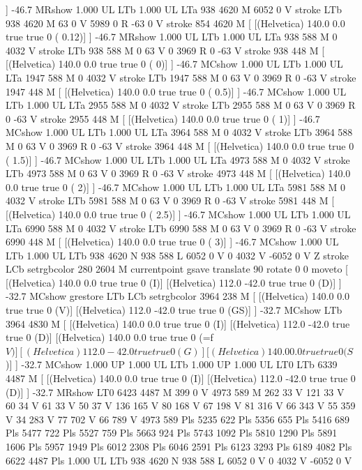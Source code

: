 ] -46.7 MRshow
1.000 UL
LTb
1.000 UL
LTa
938 4620 M
6052 0 V
stroke
LTb
938 4620 M
63 0 V
5989 0 R
-63 0 V
stroke
854 4620 M
[ [(Helvetica) 140.0 0.0 true true 0 ( 0.12)]
] -46.7 MRshow
1.000 UL
LTb
1.000 UL
LTa
938 588 M
0 4032 V
stroke
LTb
938 588 M
0 63 V
0 3969 R
0 -63 V
stroke
938 448 M
[ [(Helvetica) 140.0 0.0 true true 0 ( 0)]
] -46.7 MCshow
1.000 UL
LTb
1.000 UL
LTa
1947 588 M
0 4032 V
stroke
LTb
1947 588 M
0 63 V
0 3969 R
0 -63 V
stroke
1947 448 M
[ [(Helvetica) 140.0 0.0 true true 0 ( 0.5)]
] -46.7 MCshow
1.000 UL
LTb
1.000 UL
LTa
2955 588 M
0 4032 V
stroke
LTb
2955 588 M
0 63 V
0 3969 R
0 -63 V
stroke
2955 448 M
[ [(Helvetica) 140.0 0.0 true true 0 ( 1)]
] -46.7 MCshow
1.000 UL
LTb
1.000 UL
LTa
3964 588 M
0 4032 V
stroke
LTb
3964 588 M
0 63 V
0 3969 R
0 -63 V
stroke
3964 448 M
[ [(Helvetica) 140.0 0.0 true true 0 ( 1.5)]
] -46.7 MCshow
1.000 UL
LTb
1.000 UL
LTa
4973 588 M
0 4032 V
stroke
LTb
4973 588 M
0 63 V
0 3969 R
0 -63 V
stroke
4973 448 M
[ [(Helvetica) 140.0 0.0 true true 0 ( 2)]
] -46.7 MCshow
1.000 UL
LTb
1.000 UL
LTa
5981 588 M
0 4032 V
stroke
LTb
5981 588 M
0 63 V
0 3969 R
0 -63 V
stroke
5981 448 M
[ [(Helvetica) 140.0 0.0 true true 0 ( 2.5)]
] -46.7 MCshow
1.000 UL
LTb
1.000 UL
LTa
6990 588 M
0 4032 V
stroke
LTb
6990 588 M
0 63 V
0 3969 R
0 -63 V
stroke
6990 448 M
[ [(Helvetica) 140.0 0.0 true true 0 ( 3)]
] -46.7 MCshow
1.000 UL
LTb
1.000 UL
LTb
938 4620 N
938 588 L
6052 0 V
0 4032 V
-6052 0 V
Z stroke
LCb setrgbcolor
280 2604 M
currentpoint gsave translate 90 rotate 0 0 moveto
[ [(Helvetica) 140.0 0.0 true true 0 (I)]
[(Helvetica) 112.0 -42.0 true true 0 (D)]
] -32.7 MCshow
grestore
LTb
LCb setrgbcolor
3964 238 M
[ [(Helvetica) 140.0 0.0 true true 0 (V)]
[(Helvetica) 112.0 -42.0 true true 0 (GS)]
] -32.7 MCshow
LTb
3964 4830 M
[ [(Helvetica) 140.0 0.0 true true 0 (I)]
[(Helvetica) 112.0 -42.0 true true 0 (D)]
[(Helvetica) 140.0 0.0 true true 0 (=f\(V)]
[(Helvetica) 112.0 -42.0 true true 0 (G)]
[(Helvetica) 140.0 0.0 true true 0 (S\))]
] -32.7 MCshow
1.000 UP
1.000 UL
LTb
1.000 UP
1.000 UL
LT0
LTb
6339 4487 M
[ [(Helvetica) 140.0 0.0 true true 0 (I)]
[(Helvetica) 112.0 -42.0 true true 0 (D)]
] -32.7 MRshow
LT0
6423 4487 M
399 0 V
4973 589 M
262 33 V
121 33 V
60 34 V
61 33 V
50 37 V
136 165 V
80 168 V
67 198 V
81 316 V
66 343 V
55 359 V
34 283 V
77 702 V
66 789 V
4973 589 Pls
5235 622 Pls
5356 655 Pls
5416 689 Pls
5477 722 Pls
5527 759 Pls
5663 924 Pls
5743 1092 Pls
5810 1290 Pls
5891 1606 Pls
5957 1949 Pls
6012 2308 Pls
6046 2591 Pls
6123 3293 Pls
6189 4082 Pls
6622 4487 Pls
1.000 UL
LTb
938 4620 N
938 588 L
6052 0 V
0 4032 V
-6052 0 V
